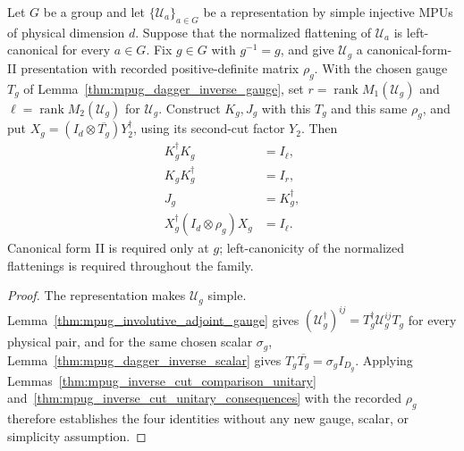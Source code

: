 \begin{lemma}
    \label{thm:mpug_involutive_comparison_unitary}
    \leanok
    Let $G$ be a group and let $\{\mathcal U_a\}_{a\in G}$ be a
    representation by simple injective MPUs of physical dimension $d$.
    Suppose that the normalized flattening of $\mathcal U_a$ is
    left-canonical for every $a\in G$. Fix $g\in G$ with $g^{-1}=g$,
    and give $\mathcal U_g$ a canonical-form-II presentation with recorded
    positive-definite matrix $\rho_g$. With the chosen gauge $T_g$ of
    Lemma~\ref{thm:mpug_dagger_inverse_gauge}, set
    $r=\operatorname{rank}M_1(\mathcal U_g)$ and
    $\ell=\operatorname{rank}M_2(\mathcal U_g)$ for $\mathcal U_g$. Construct
    $K_g,J_g$ with this $T_g$ and this same $\rho_g$, and put
    $X_g=(I_d\otimes\overline{T_g})Y_2^\dagger$, using its second-cut
    factor $Y_2$. Then
    \begin{align}
        K_g^\dagger K_g                  & =I_\ell,      \\
        K_gK_g^\dagger                   & =I_r,         \\
        J_g                              & =K_g^\dagger, \\
        X_g^\dagger(I_d\otimes\rho_g)X_g & =I_\ell.
    \end{align}
    Canonical form II is required only at $g$; left-canonicity of the
    normalized flattenings is required throughout the family.
\end{lemma}
\begin{proof}\leanok
    The representation makes $\mathcal U_g$ simple.
    Lemma~\ref{thm:mpug_involutive_adjoint_gauge} gives
    $(\mathcal U_g^\dagger)^{ij}=T_g^\dagger\mathcal U_g^{ij}T_g$ for
    every physical pair, and for the same chosen scalar $\sigma_g$,
    Lemma~\ref{thm:mpug_dagger_inverse_scalar} gives
    $T_g\overline{T_g}=\sigma_g I_{D_g}$. Applying
    Lemmas~\ref{thm:mpug_inverse_cut_comparison_unitary}
    and~\ref{thm:mpug_inverse_cut_unitary_consequences} with the recorded
    $\rho_g$ therefore establishes the four identities without any new gauge,
    scalar, or simplicity assumption.
\end{proof}


